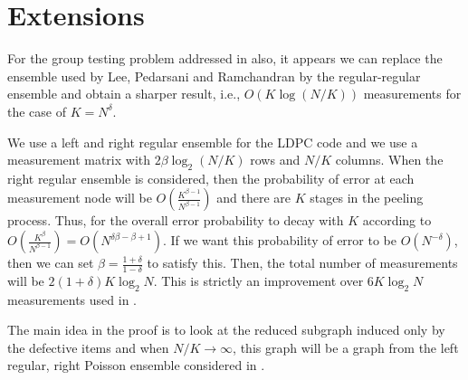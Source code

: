 \documentclass[conference]{IEEEtran}
\begin{document}
\section{Extensions} %
%
%

For the group testing problem addressed in \cite{lee2015saffron} also, it appears we can replace the ensemble used by Lee, Pedarsani and Ramchandran by the regular-regular ensemble and obtain a sharper result, i.e., $O(K \log (N/K))$ measurements for the case of $K = N^\delta$.

We use a left and right regular ensemble for the LDPC code and we use a measurement matrix with $2 \beta \log_2(N/K)$ rows and $N/K$ columns. When the right regular ensemble is considered, then the probability of error at each measurement node will be $O\left(\frac{K^{\beta-1}}{N^{\beta-1}}\right)$ and there are $K$ stages in the peeling process. Thus, for the overall error probability to decay with $K$ according to $O\left(\frac{K^{\beta}}{N^{\beta-1}}\right) = O\left(N^{\delta \beta - \beta + 1}\right)$. If we want this probability of error to be $O(N^{-\delta})$, then we can set $\beta = \frac{1+\delta}{1-\delta}$ to satisfy this. Then, the total number of measurements will be $2 (1+\delta) K \log_2 N$. This is strictly an improvement over $6 K \log_2 N$ measurements used in \cite{lee2015saffron}.

The main idea in the proof is to look at the reduced subgraph induced only by the defective items and when $N/K \rightarrow \infty$, this graph will be a graph from the left regular, right Poisson ensemble considered in \cite{lee2015saffron}.


\end{document}
